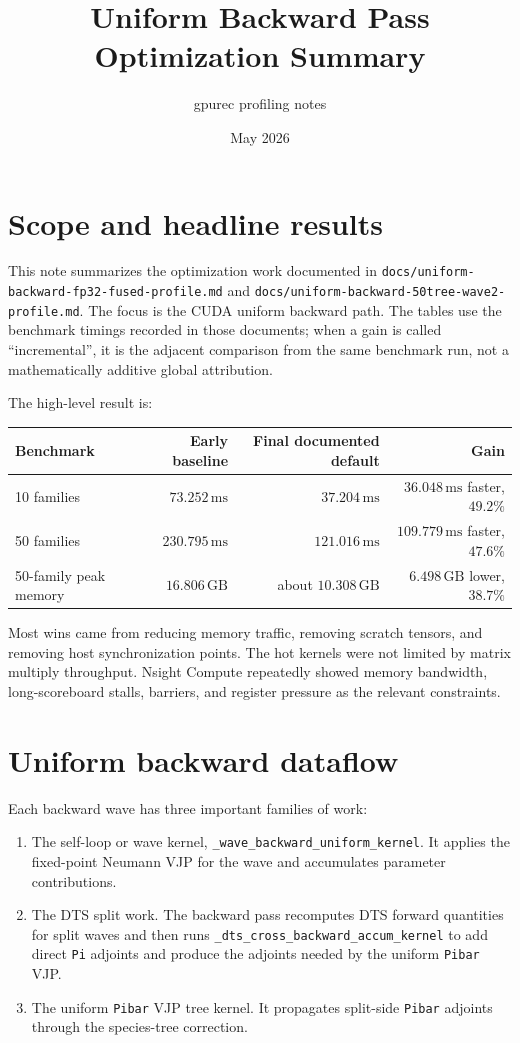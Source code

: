 \documentclass[11pt]{article}
\title{Uniform Backward Pass Optimization Summary}
\author{gpurec profiling notes}
\date{May 2026}
\newcommand{\ms}{\,\mathrm{ms}}
\newcommand{\gb}{\,\mathrm{GB}}
\newcommand{\code}[1]{\texttt{#1}}
\begin{document}
\maketitle

\section{Scope and headline results}

This note summarizes the optimization work documented in
\code{docs/uniform-backward-fp32-fused-profile.md} and
\code{docs/uniform-backward-50tree-wave2-profile.md}.  The focus is the CUDA
uniform backward path.  The tables use the benchmark timings recorded in those
documents; when a gain is called ``incremental'', it is the adjacent comparison
from the same benchmark run, not a mathematically additive global attribution.

The high-level result is:

\begin{center}
\begin{tabular}{lrrr}
\toprule
Benchmark & Early baseline & Final documented default & Gain \\
\midrule
10 families & $73.252\ms$ & $37.204\ms$ & $36.048\ms$ faster, $49.2\%$ \\
50 families & $230.795\ms$ & $121.016\ms$ & $109.779\ms$ faster, $47.6\%$ \\
50-family peak memory & $16.806\gb$ & about $10.308\gb$ & $6.498\gb$ lower, $38.7\%$ \\
\bottomrule
\end{tabular}
\end{center}

Most wins came from reducing memory traffic, removing scratch tensors, and
removing host synchronization points.  The hot kernels were not limited by
matrix multiply throughput.  Nsight Compute repeatedly showed memory bandwidth,
long-scoreboard stalls, barriers, and register pressure as the relevant
constraints.

\section{Uniform backward dataflow}

Each backward wave has three important families of work:

\begin{enumerate}[leftmargin=*]
\item The self-loop or wave kernel, \code{\_wave\_backward\_uniform\_kernel}.
      It applies the fixed-point Neumann VJP for the wave and accumulates
      parameter contributions.
\item The DTS split work.  The backward pass recomputes DTS forward quantities
      for split waves and then runs \code{\_dts\_cross\_backward\_accum\_kernel}
      to add direct \code{Pi} adjoints and produce the adjoints needed by the
      uniform \code{Pibar} VJP.
\item The uniform \code{Pibar} VJP tree kernel.  It propagates split-side
      \code{Pibar} adjoints through the species-tree correction.
\end{enumerate}
\end{document}

